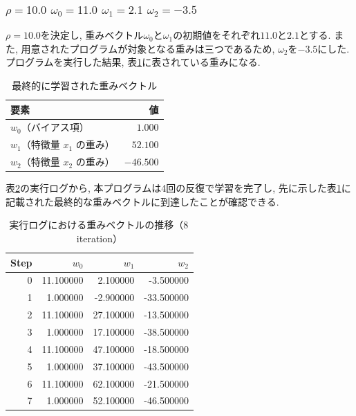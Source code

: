 \documentclass[a4j, 12pt]{jarticle}
\begin{document}
\subsubsection{$\rho=10.0$ $\omega_0=11.0$ $\omega_1=2.1$ $\omega_2=-3.5$}
$\rho=10.0$を決定し, 重みベクトル$\omega_0$と$\omega_1$の初期値をそれぞれ$11.0$と$2.1$とする. また, 用意されたプログラムが対象となる重みは三つであるため, $\omega_2$を$-3.5$にした. \\
プログラムを実行した結果, 表\ref{self3finalweights}に表されている重みになる. 
\begin{table}[H]
  \centering
  \caption{最終的に学習された重みベクトル}\label{self3finalweights}
  \begin{tabular}{l r}
    \hline
    要素 & 値 \\
    \hline
    $w_0$（バイアス項） & $1.000$ \\
    $w_1$（特徴量 $x_1$ の重み） & $52.100$ \\
    $w_2$（特徴量 $x_2$ の重み）& $-46.500$ \\
    \hline
  \end{tabular}
\end{table}
表\ref{self3logs}の実行ログから, 本プログラムは4回の反復で学習を完了し, 先に示した表\ref{self3finalweights}に記載された最終的な重みベクトルに到達したことが確認できる.
\begin{table}[H]
  \centering
  \caption{実行ログにおける重みベクトルの推移（8\,iteration）}\label{self3logs}
  \begin{tabular}{r|rrr}
  \hline
  Step & $w_0$ & $w_1$ & $w_2$ \\
  \hline
   0 & 11.100000 &  2.100000 &  -3.500000 \\
   1 &  1.000000 & -2.900000 & -33.500000 \\
   2 & 11.100000 & 27.100000 & -13.500000 \\
   3 &  1.000000 & 17.100000 & -38.500000 \\
   4 & 11.100000 & 47.100000 & -18.500000 \\
   5 &  1.000000 & 37.100000 & -43.500000 \\
   6 & 11.100000 & 62.100000 & -21.500000 \\
   7 &  1.000000 & 52.100000 & -46.500000 \\
  \hline
  \end{tabular}
\end{table}
\end{document}
